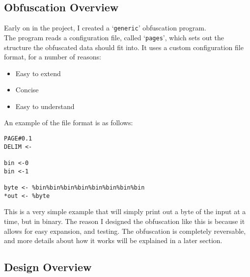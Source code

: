 \subsection{Obfuscation Overview}
Early on in the project, I created a `\texttt{generic}' obfuscation program.\\
The program reads a configuration file, called `\texttt{pages}', which sets out the structure the obfuscated data should fit into. It uses a custom configuration file format, for a number of reasons:
\begin{itemize}
    \item Easy to extend
    \item Concise
    \item Easy to understand
\end{itemize}
An example of the file format is as follows:
\begin{verbatim}
PAGE#0.1
DELIM <-

bin <-0
bin <-1 

byte <- %bin%bin%bin%bin%bin%bin%bin%bin
*out <- %byte
\end{verbatim}
This is a very simple example that will simply print out a byte of the input at a time, but in binary.
The reason I designed the obfuscation like this is because it allows for easy expansion, and testing.
The obfuscation is completely reversable, and more details about how it works will be explained in a later section.

\subsection{Design Overview}
